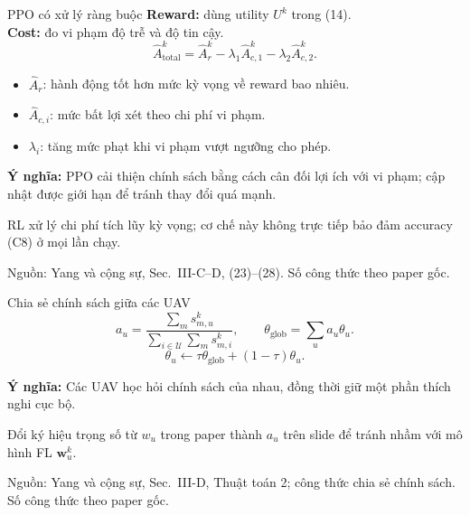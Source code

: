 \documentclass[10pt,aspectratio=43]{beamer}
\newcommand{\source}[1]{\par\vfill{\fontsize{5.8}{7}\selectfont\color{Muted}Nguồn: #1\par}}
\newcommand{\paperref}[1]{\source{Yang và cộng sự, Sec.~#1. Số công thức theo paper gốc.}}
\newcommand{\eqmeaning}[1]{\par\medskip\textcolor{HustRed}{\textbf{Ý nghĩa:}} #1\par}
\newcommand{\noteonly}[1]{\par{\footnotesize\color{Muted}#1\par}}
\begin{document}
\begin{frame}[t]{PPO có xử lý ràng buộc}
\relax
\textbf{Reward:} dùng utility $U^k$ trong (14).\\
\textbf{Cost:} đo vi phạm độ trễ và độ tin cậy.
\begin{equation}
\widehat A_{\mathrm{total}}^k=\widehat A_r^k
-\lambda_1\widehat A_{c,1}^k-\lambda_2\widehat A_{c,2}^k.
\tag{27}
\end{equation}
\begin{itemize}
\setlength{\itemsep}{.5em}
\item $\widehat A_r$: hành động tốt hơn mức kỳ vọng về reward bao nhiêu.
\item $\widehat A_{c,i}$: mức bất lợi xét theo chi phí vi phạm.
\item $\lambda_i$: tăng mức phạt khi vi phạm vượt ngưỡng cho phép.
\end{itemize}
\eqmeaning{PPO cải thiện chính sách bằng cách cân đối lợi ích với vi phạm; cập nhật được giới hạn để tránh thay đổi quá mạnh.}
\noteonly{RL xử lý chi phí tích lũy kỳ vọng; cơ chế này không trực tiếp bảo đảm accuracy (C8) ở mọi lần chạy.}
\paperref{III-C--D, (23)--(28)}
\end{frame}

\begin{frame}[t]{Chia sẻ chính sách giữa các UAV}
\relax
\[
a_u=\frac{\sum_m s_{m,u}^k}{\sum_{i\in\mathcal U}\sum_m s_{m,i}^k},
\qquad \theta_{\mathrm{glob}}=\sum_u a_u\theta_u.
\]
\[
\theta_u\leftarrow\tau\theta_{\mathrm{glob}}+(1-\tau)\theta_u.
\]
\par{}
\eqmeaning{Các UAV học hỏi chính sách của nhau, đồng thời giữ một phần thích nghi cục bộ.}
\noteonly{Đổi ký hiệu trọng số từ $w_u$ trong paper thành $a_u$ trên slide để tránh nhầm với mô hình FL $\mathbf w_u^k$.}
\paperref{III-D, Thuật toán 2; công thức chia sẻ chính sách}
\end{frame}
\end{document}
